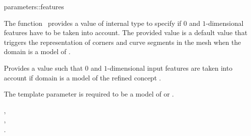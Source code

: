 \ccRefPageBegin


\begin{ccRefFunction}{parameters::features}  %


\ccDefinition
  
The function \ccRefName\  provides a  value of internal type 
to specify if  $0$ and $1$-dimensional features have to be taken into account.
The provided value is a default value that triggers the representation
of corners and  curve segments in the mesh when the domain is a model
of  .


Provides a  value such that
 $0$ and $1$-dimensional input features are taken into account
 if domain is a model of  the refined concept .

 \ccParameters
The template parameter  is required to be a model
of  or .



\ccSeeAlso

, \\
, \\
. \\





\end{ccRefFunction}

\ccRefPageEnd

